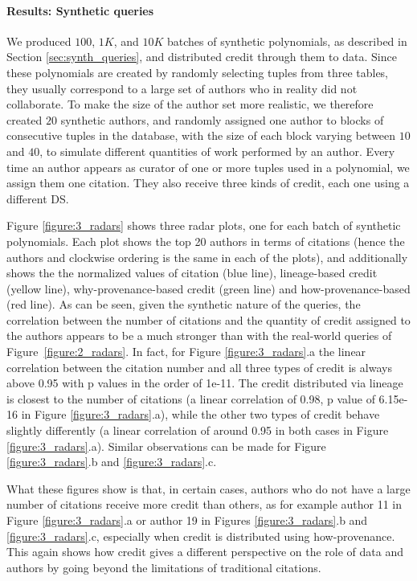 \paragraph{Results: Synthetic queries}
We produced $100$, $1K$, and $10K$ batches of synthetic polynomials, as described in Section \ref{sec:synth_queries}, and distributed credit through them to data. 
Since these polynomials are created by randomly selecting tuples from three tables, they usually correspond to a large set of authors who in reality did not collaborate. To make the size of the author set more realistic, we therefore created $20$ synthetic authors, and randomly assigned one author to blocks of consecutive tuples in the database, with the size of each block varying between $10$ and $40$, to simulate different quantities of work performed by an author. 
Every time an author appears as curator of one or more tuples used in a polynomial, we assign them one citation.  
They also receive three kinds of credit, each one using a different DS.

Figure \ref{figure:3_radars} shows three radar plots, one for each batch of synthetic polynomials.  Each plot shows the top 20 authors in terms of citations (hence the authors and clockwise ordering is the same in each of the plots), and additionally shows the the normalized values of citation (blue line), lineage-based credit (yellow line), why-provenance-based credit (green line) and how-provenance-based (red line). 
As can be seen, given the synthetic nature of the queries, the correlation between the number of citations and the quantity of credit assigned to the authors appears to be a much stronger than with the real-world queries of Figure~\ref{figure:2_radars}. In fact, for Figure \ref{figure:3_radars}.a  the linear correlation between the citation number and all three types of credit is always above 0.95 with p values in the order of 1e-11.
The credit distributed via lineage is closest to  the number of citations (a linear correlation of 0.98, p value of 6.15e-16 in Figure \ref{figure:3_radars}.a), while the other two types of credit behave slightly differently (a linear correlation of around 0.95 in both cases in Figure \ref{figure:3_radars}.a).  
Similar observations can be made for Figure \ref{figure:3_radars}.b and \ref{figure:3_radars}.c.

What these figures show is that, in certain cases, authors who do not have a large number of citations receive more credit than others, as for example author 11 in Figure \ref{figure:3_radars}.a or author 19 in Figures \ref{figure:3_radars}.b and \ref{figure:3_radars}.c, especially when credit is distributed using how-provenance.
This again shows how credit gives a different perspective on the role of data and authors by going beyond the limitations of traditional citations.  

